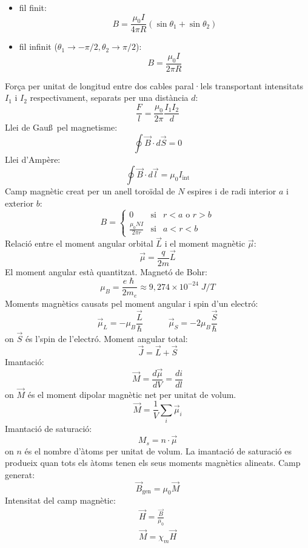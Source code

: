 \documentclass[../../../main.tex]{subfiles}
\begin{document}
\begin{multicols}{2}
\begin{itemize}
              \begin{itemize}
                  \item fil finit: $$B=\frac{\mu_0I}{4\pi R}(\sin\theta_1+\sin\theta_2)$$
                  \item fil infinit ($\theta_1\to-\pi/2,\theta_2\to\pi/2$): $$B=\frac{\mu_0I}{2\pi R}$$
              \end{itemize}
    \end{itemize}
    Força per unitat de longitud entre dos cables paral·lels transportant intensitats $I_1$ i $I_2$ res\-pec\-ti\-va\-ment, separats per una distància $d$: $$\frac{F}{l}=\frac{\mu_0}{2\pi}\frac{I_1I_2}{d}$$
    Llei de Gau\ss\ pel magnetisme: $$\oint\Vec{B}\cdot d\Vec{S}=0$$
    Llei d'Ampère: $$\oint\Vec{B}\cdot d\Vec{l}=\mu_0I_{\text{int}}$$
    Camp magnètic creat per un anell toroïdal de $N$ espires i de radi interior $a$ i exterior $b$: $$B=\left\{
        \begin{array}{ccc}
            0                                   & \text{si} & r<a\text{ o }r>b \\
            \displaystyle\frac{\mu_0NI}{2\pi r} & \text{si} & a<r<b
        \end{array}\right.$$
    Relació entre el moment angular orbital $\Vec{L}$ i el moment magnètic $\Vec{\mu}$: $$\Vec{\mu}=\frac{q}{2m}\Vec{L}$$
    El moment angular està quantitzat.\newline
    Magnetó de Bohr: $$\mu_B=\frac{e\hslash}{2m_e}\approx9,274\times10^{-24}\;J/T$$
    Moments magnètics causats pel moment angular i spin d'un electró:
    $$\Vec{\mu}_L=-\mu_B\frac{\Vec{L}}{\hslash}\quad\qquad\Vec{\mu}_S=-2\mu_B\frac{\Vec{S}}{\hslash}$$ {on $\Vec{S}$ és l'spin de l'electró.}\newline
    Moment angular total: $$\Vec{J}=\Vec{L}+\Vec{S}$$
    Imantació: $$\Vec{M}=\frac{d\Vec{\mu}}{dV}=\frac{di}{dl}$$ {on $\Vec{M}$ és el moment dipolar magnètic net per unitat de volum.}
    $$\Vec{M}=\frac{1}{V}\sum_i\Vec{\mu}_i$$
    Imantació de saturació: $$M_s=n\cdot\Vec{\mu}$$ {on $n$ és el nombre d'àtoms per unitat de volum.}\newline
    La imantació de saturació es produeix quan tots els àtoms tenen els seus moments magnètics alineats.\newline
    Camp generat:
    $$\Vec{B}_{\text{gen}}=\mu_0\Vec{M}$$
    Intensitat del camp magnètic: \begin{gather*}
        \Vec{H}=\frac{\Vec{B}}{\mu_0}\\
        \Vec{M}=\chi_m\Vec{H}

\end{gather*}
\end{multicols}
\end{document}
